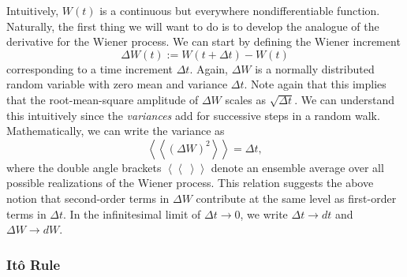 \documentclass[12pt,aps,onecolum,superscriptaddress,footinbib,floatfix,showpacs]{revtex4-1}
\newcommand{\dlangle}{\left\langle\!\left\langle}
\newcommand{\drangle}{\right\rangle\!\right\rangle}
\def\dexpct#1{\dlangle{#1}\drangle}
\begin{document}
Intuitively, $W(t)$ is a continuous but everywhere nondifferentiable function.
Naturally, the first thing we will want to do is to develop the analogue
of the derivative for the Wiener process.
We can start by defining the Wiener increment
\begin{equation}
  \Delta W(t) := W(t+\Delta t)-W(t)
\end{equation}
corresponding to a time increment $\Delta t$.
Again, $\Delta W$ is a normally distributed random variable with 
zero mean and variance $\Delta t$.
Note again that this implies that the root-mean-square amplitude of
$\Delta W$ scales as $\sqrt{\Delta t}$.  We can understand this
intuitively since the \textit{variances} add for successive steps
in a random walk.  Mathematically, we can write the variance as
\begin{equation}
  \dexpct{(\Delta W)^2} = \Delta t,
\end{equation}
where the double angle brackets $\dexpct{~}$ denote an ensemble
average over all possible realizations of the Wiener process.
This relation suggests the above notion that second-order terms in
$\Delta W$ contribute at the same level as first-order terms in $\Delta t$.
In the infinitesimal limit of $\Delta t\longrightarrow 0$, we 
write $\Delta t\longrightarrow dt$
and $\Delta W\longrightarrow dW$.

\subsubsection{It\^o Rule}
\end{document}
